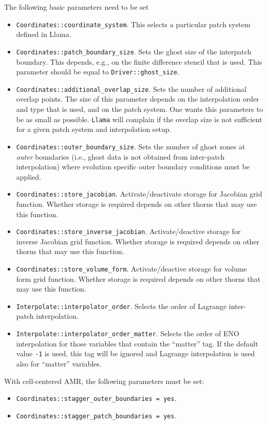 \documentclass{article}
\begin{document}
The following basic parameters need to be set 
 \begin{itemize}
 \item {\verb|Coordinates::coordinate_system|}. This selects a particular patch system defined in Llama.
 \item {\verb|Coordinates::patch_boundary_size|}. Sets the ghost size of the interpatch boundary. This depends, e.g., on the finite difference stencil that is used.
       This parameter should be equal to {\verb|Driver::ghost_size|}.
 \item {\verb|Coordinates::additional_overlap_size|}. Sets the number of additional overlap points. The size of this parameter depends on the interpolation order and type that is used,
       and on the patch system. One wants this parameters to be as small as possible. {\tt Llama} will complain if the overlap size is not sufficient for a given patch system
       and interpolation setup.
 \item {\verb|Coordinates::outer_boundary_size|}. Sets the number of ghost zones at \textit{outer} boundaries (i.e., ghost data is not obtained from inter-patch interpolation)
       where evolution specific outer boundary conditions must be applied.
 \item {\verb|Coordinates::store_jacobian|}. Activate/deactivate storage for Jacobian grid function. Whether storage is required depends on other thorns that may use this function.
 \item {\verb|Coordinates::store_inverse_jacobian|}. Activate/deactive storage for inverse Jacobian grid function. Whether storage is required depends on other thorns that may use this function.
 \item {\verb|Coordinates::store_volume_form|}. Activate/deactive storage for volume form grid function. Whether storage is required depends on other thorns that may use this function.
 \item {\verb|Interpolate::interpolator_order|}. Selects the order of Lagrange inter-patch interpolation.
 \item {\verb|Interpolate::interpolator_order_matter|}. Selects the order of ENO interpolation for those variables that contain the ``matter'' tag.
       If the default value {\tt -1} is used, this tag will be ignored and Lagrange interpolation is used also for ``matter'' variables.
\end{itemize}
  
With cell-centered AMR, the following parameters must be set:
\begin{itemize}
 \item {\verb|Coordinates::stagger_outer_boundaries = yes|}.
 \item {\verb|Coordinates::stagger_patch_boundaries = yes|}.
\end{itemize}
\end{document}
